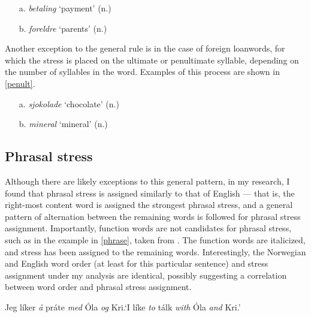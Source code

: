 \documentclass{article}
\begin{document}
\begin{exe}
    \ex
    \label{second}
    \begin{itemize}
        \item [a.] \textit{betaling}  `payment' (n.)
        \item [b.] \textit{foreldre}  `parents' (n.)
    \end{itemize}
\end{exe}

Another exception to the general rule is in the case of foreign loanwords, for which the stress is placed on the ultimate or penultimate syllable, depending on the number of syllables in the word. Examples of this process are shown in \ref{penult}. \cite{TransparentLanguage}

\begin{exe}
    \ex
    \label{penult}
    \begin{itemize}
        \item [a.] \textit{sjokolade}  `chocolate' (n.)
        \item [b.] \textit{mineral}  `mineral' (n.)
    \end{itemize}
\end{exe}

\subsection{Phrasal stress}
Although there are likely exceptions to this general pattern, in my research, I found that phrasal stress is assigned similarly to that of English — that is, the right-most content word is assigned the strongest phrasal stress, and a general pattern of alternation between the remaining words is followed for phrasal stress assignment. Importantly, function words are not candidates for phrasal stress, such as in the example in \ref{phrase}, taken from \cite{TransparentLanguage}. The function words are italicized, and stress has been assigned to the remaining words. Interestingly, the Norwegian and English word order (at least for this particular sentence) and stress assignment under my analysis are identical, possibly suggesting a correlation between word order and phrasal stress assignment.

\begin{exe}
    \ex
    \label{phrase}
    \begin{itemize}
        Jeg l\'iker \textit{å} pr\'ate \textit{med} \'Ola \textit{og} Kri.\newline `I l\'ike \textit{to} t\'alk \textit{with} \'Ola \textit{and} Kri.'
    \end{itemize}
\end{exe}
\end{document}
